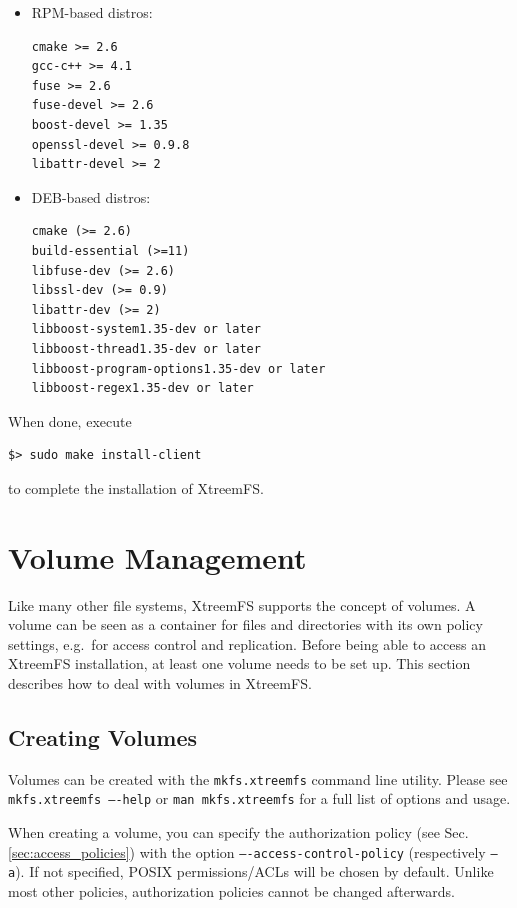 \documentclass[a4paper,10pt]{book}
\begin{document}
\begin{itemize}
 \item RPM-based distros: \begin{verbatim}
cmake >= 2.6
gcc-c++ >= 4.1
fuse >= 2.6
fuse-devel >= 2.6
boost-devel >= 1.35
openssl-devel >= 0.9.8
libattr-devel >= 2
\end{verbatim}

 \item DEB-based distros: \begin{verbatim}
cmake (>= 2.6)
build-essential (>=11)
libfuse-dev (>= 2.6)
libssl-dev (>= 0.9)
libattr-dev (>= 2)
libboost-system1.35-dev or later
libboost-thread1.35-dev or later
libboost-program-options1.35-dev or later
libboost-regex1.35-dev or later
\end{verbatim}
\end{itemize}

When done, execute

\begin{verbatim}
$> sudo make install-client
\end{verbatim}

to complete the installation of XtreemFS.


\section{Volume Management}

Like many other file systems, XtreemFS supports the concept of volumes. A volume can be seen as a container for files and directories with its own policy settings, e.g.\ for access control and replication. Before being able to access an XtreemFS installation, at least one volume needs to be set up. This section describes how to deal with volumes in XtreemFS.

\subsection{Creating Volumes}
\label{sec:create_volume}

Volumes can be created with the \texttt{mkfs.xtreemfs} command line utility. Please see \texttt{mkfs.xtreemfs ----help} or \texttt{man mkfs.xtreemfs} for a full list of options and usage.

When creating a volume, you can specify the authorization policy (see Sec. \ref{sec:access_policies}) with the option \texttt{----access-control-policy} (respectively \texttt{--a}). If not specified, POSIX permissions/ACLs will be chosen by default. Unlike most other policies, authorization policies cannot be changed afterwards.
\end{document}
